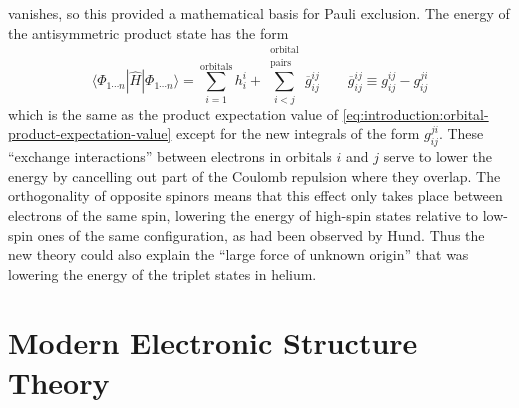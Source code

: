 vanishes, so this provided a mathematical basis for Pauli exclusion.
The energy of the antisymmetric product state has the form
\begin{equation}
    \label{eq:introduction:determinant-expectation-value}
    \langle \Phi_{1\cdots n}|
    \hat{H}
    |\Phi_{1\cdots n} \rangle
    =
    \sum_{i=1}^\mathrm{orbitals}
    h_i^i
    +
    \sum_{i<j}^{\substack{\mathrm{orbital}\\\mathrm{pairs}}}
    \overline{g}_{ij}^{ij}
    \qquad
    \overline{g}_{ij}^{ij}
    \equiv
    g_{ij}^{ij}
    -
    g_{ij}^{ji}
\end{equation}
which is the same as the product expectation value of
\cref{eq:introduction:orbital-product-expectation-value} except for the new
integrals of the form
\(
    g_{ij}^{ji}
\).
These ``exchange interactions'' between electrons in orbitals \(i\) and \(j\)
serve to lower the energy by cancelling out part of the Coulomb repulsion where
they overlap.
The orthogonality of opposite spinors means that this effect only takes place
between electrons of the same spin, lowering the energy of high-spin states
relative to low-spin ones of the same configuration, as had been observed by
Hund.\cite{Hund:1925p345}
Thus the new theory could also explain the ``large force of unknown
origin''\cite{Mehra:1982} that was lowering the energy of the triplet states in
helium.


\section{Modern Electronic Structure Theory}

